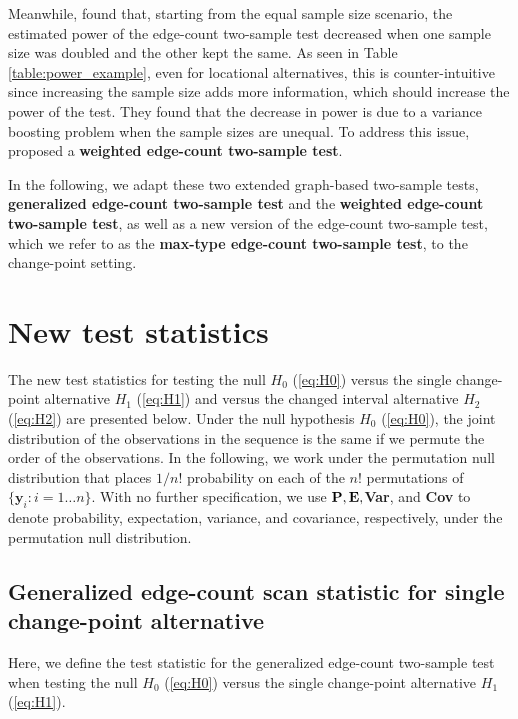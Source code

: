 \documentclass[arxiv, preprint]{imsart}
\numberwithin{equation}{section}
\theoremstyle{plain}
\begin{document}
Meanwhile, \citet*{chen2017weighted} found that, starting from the equal sample size scenario, the estimated power of the edge-count two-sample test decreased when one sample size was doubled and the other kept the same. As seen in Table \ref{table:power_example}, even for locational alternatives, this is counter-intuitive since increasing the sample size adds more information, which should increase the power of the test. They found that the decrease in power is due to a variance boosting problem when the sample sizes are unequal.  To address this issue, \citet*{chen2017weighted} proposed a \textbf{weighted edge-count two-sample test}. 


In the following, we adapt these two extended graph-based two-sample tests, \textbf{generalized edge-count two-sample test} and the \textbf{weighted edge-count two-sample test}, as well as a new version of the edge-count two-sample test, which we refer to as the \textbf{max-type edge-count two-sample test}, to the change-point setting. %

\section{New test statistics}
\label{sec:3}
The new test statistics for testing the null $H_0$ (\ref{eq:H0}) versus the single change-point alternative $H_1$ (\ref{eq:H1}) and versus the changed interval alternative $H_2$ (\ref{eq:H2}) are presented below. Under the null hypothesis $H_0$ (\ref{eq:H0}), the joint distribution of the observations in the sequence is the same if we permute the order of the observations. In the following, we work under the permutation null distribution that places $1/n!$ probability on each of the $n!$ permutations of $\{ \mathbf{y}_i: i = 1 \hdots n \}$. With no further specification, we use $\mathbf{P}, \mathbf{E},$\textbf{Var}, and \textbf{Cov} to denote probability, expectation, variance, and covariance, respectively, under the permutation null distribution. 

\subsection{Generalized edge-count scan statistic for single change-point alternative}
\label{sec:3.1}
Here, we define the test statistic for the generalized edge-count two-sample test when testing the null $H_0$ (\ref{eq:H0}) versus the single change-point alternative $H_1$ (\ref{eq:H1}). 
\end{document}

